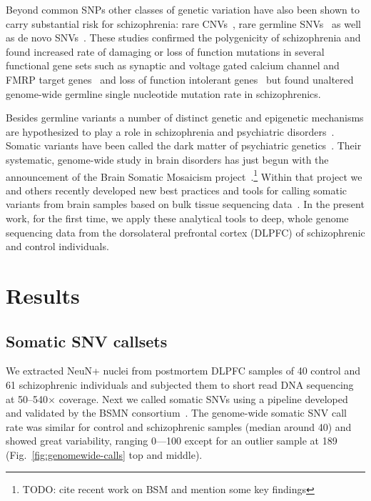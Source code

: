 \documentclass[letterpaper]{article}
\begin{document}
Beyond common SNPs other classes of genetic variation have also been shown to
carry substantial risk for schizophrenia: rare CNVs~\citep{Rees2014}, rare
germline SNVs~\citep{Purcell2014,Singh2017} as well as de novo
SNVs~\citep{Fromer2014,Rees2020}.  These studies confirmed the polygenicity of
schizophrenia and found increased rate of damaging or loss of function
mutations in several functional gene sets such as synaptic and voltage gated
calcium channel and FMRP target genes~\citep{Fromer2014,Purcell2014} and loss
of function intolerant genes~\citep{Rees2020,Singh2017} but found unaltered
genome-wide germline single nucleotide mutation rate in schizophrenics.

Besides germline variants a number of distinct genetic and epigenetic
mechanisms are hypothesized to play a role in schizophrenia and psychiatric
disorders~\citep{PsychENCODEConsortium2015}.  Somatic variants have been
called the dark matter of psychiatric genetics~\citep{Insel2014}.  Their
systematic, genome-wide study in brain disorders has just begun with the
announcement of the Brain Somatic Mosaicism
project~\citep{McConnell2017}.\footnote{TODO: cite recent work on BSM and mention
some key findings}
Within that project we and others recently developed new best practices and
tools for calling somatic variants from brain samples based on bulk tissue
sequencing data~\citep{Wang2021}.  In the present work, for the first time, we
apply these analytical tools to deep, whole genome sequencing data from the
dorsolateral prefrontal cortex (DLPFC) of schizophrenic and control
individuals.

\section*{Results}

\subsection*{Somatic SNV callsets}

We extracted NeuN+ nuclei from postmortem DLPFC samples of 40 control
and 61 schizophrenic individuals and subjected them to short read DNA
sequencing at 50--540\(\times\) coverage.  Next we called somatic SNVs using a
pipeline developed and validated by the BSMN consortium~\citep{Wang2021}.  The
genome-wide somatic SNV call rate was similar for control and schizophrenic
samples (median around 40) and showed great variability, ranging 
0---100 except for an outlier sample at 189
(Fig.~\ref{fig:genomewide-calls} top and middle).
\end{document}
